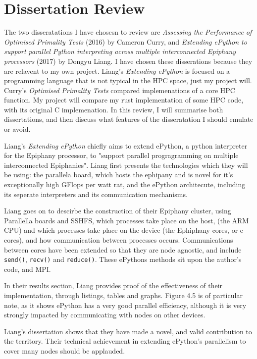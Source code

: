 \documentclass{article}
\begin{document}
\section{Dissertation Review}
The two disseratations I have chosesn to review are \textit{Assessing the Performance of Optimised Primality Tests} (2016) by Cameron Curry, and \textit{Extending ePython to support parallel Python interpreting across multiple interconnected Epiphany processors} (2017) by Dongyu Liang. I have chosen these disserations because they are relavent to my own project. Liang's \textit{Extending ePython} is focused on a programming language that is not typical in the HPC space, just my project will. Curry's \textit{Optimised Primality Tests} compared implemenations of a core HPC function. My project will compare my rust implementation of some HPC code, with its original C implemenation. In this review, I will summarise both dissertations, and then discuss what features of the disseratation I should emulate or avoid.

Liang's \textit{Extending ePython} chiefly aims to extend ePython, a python interpreter for the Epiphany processor, to "support parallel progragramming on multiple interconnected Epiphanies". Liang first presents the technologies which they will be using: the parallela board, which hosts the ephipany and is novel for it's exceptionally high GFlops per watt rat, and the ePython architecute, including its seperate interpreters and its communication mechanisms.

Liang goes on to descirbe the construction of their Epiphany cluster, using Parallella boards and SSHFS, which processes take place on the host, (the ARM CPU) and which processes take place on the device (the Ephiphany cores, or e-cores), and how communication between processes occurs. Communications between cores have been extended so that they are node agnostic, and include \texttt{send()}, \texttt{recv()} and \texttt{reduce()}. These ePythons methods sit upon the author's code, and MPI.

In their results section, Liang provides proof of the effectiveness of their implementation, through listings, tables and graphs. Figure 4.5 is of particular note, as it shows ePython has a very good parallel efficiency, although it is very strongly impacted by communicating with nodes on other devices.

 Liang's dissertation shows that they have made a novel, and valid contribution to the territory. Their technical achievement in extending ePython's parallelism to cover many nodes should be applauded. 
\end{document}
